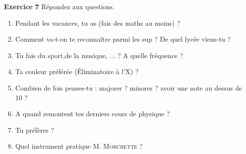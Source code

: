     \vspace{2mm}
    \noindent \textbf{Exercice 7} Répondez aux questions.
    
    \begin{enumerate}
        \item Pendant les vacances, tu as (fais des maths au moins) ? \enspace\hrulefill \\
        \text{}\enspace\hrulefill
        
        \item Comment va-t-on te reconnaître parmi les sup ? De quel lycée viens-tu ?\enspace\hrulefill  \\
        \text{}\enspace\hrulefill
        
        \item Tu fais du sport,de la musique, ... ? A quelle fréquence ? \enspace\hrulefill \\
        \text{}\enspace\hrulefill
        
        \item Ta couleur préférée (Éliminatoire à l'X) ? \enspace\hrulefill 
        
        \item Combien de fois penses-tu : majorer ? minorer ? avoir une note au dessus de 10 ? \enspace\hrulefill\\
        \text{}\enspace\hrulefill
        
        \item A quand remontent tes derniers cours de physique ?  \hfill {} \hfill {} \hfill\text{}
        
        \item Tu préfères ? \quad {} \hfill {} \hfill {} \hfill {} \hfill {}\qquad\text{}
        
        \item Quel instrument pratique M. \textsc{Morcrette} ? \enspace\hrulefill
        

\end{enumerate}
